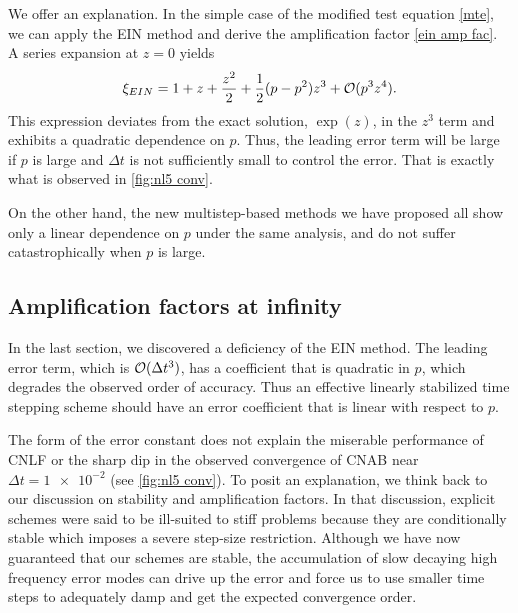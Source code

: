 We offer an explanation. In the simple case of the modified test equation \cref{mte}, we can apply the EIN method and derive the amplification factor \cref{ein amp fac}. A series expansion at $z=0$ yields
\begin{align}
        \xi_{EIN}
= 1 + z + \frac{z^2}{2} + \frac{1}{2}(p-p^2)z^3 + \mathcal{O}(p^3z^4).
\end{align}
This expression deviates from the exact solution, $\exp(z)$, in the $z^3$ term and exhibits a quadratic dependence on $p$. Thus, the leading error term will be large if $p$ is large and $\Delta t$ is not sufficiently small to control the error. That is exactly what is observed in \cref{fig:nl5 conv}.

On the other hand, the new multistep-based methods we have proposed all show only a linear dependence on $p$ under the same analysis, and do not suffer catastrophically when $p$ is large.

\subsection{Amplification factors at infinity}
In the last section, we discovered a deficiency of the EIN method. The leading error term, which is $\mathcal{O}(\Delta t^3)$, has a coefficient that is quadratic in $p$, which degrades the observed order of accuracy. Thus an effective linearly stabilized time stepping scheme should have an error coefficient that is linear with respect to $p$. 

The form of the error constant does not explain the miserable performance of CNLF or the sharp dip in the observed convergence of CNAB  near $\Delta t = \num{1e-2}$ (see \cref{fig:nl5 conv}). To posit an explanation, we think back to our discussion on stability and amplification factors. In that discussion, explicit schemes were said to be ill-suited to stiff problems because they are conditionally stable which imposes a severe step-size restriction. Although we have now guaranteed that our schemes are stable, the accumulation of slow decaying high frequency error modes can drive up the error and force us to use smaller time steps to adequately damp and get the expected convergence order.

